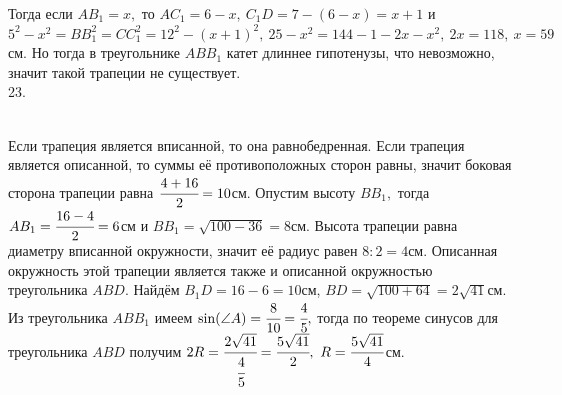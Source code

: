 \documentclass[12pt]{article}
\begin{document}
Тогда если $AB_1=x,$ то $AC_1=6-x,\ C_1D=7-(6-x)=x+1$ и $5^2-x^2=BB_1^2=CC_1^2=12^2-(x+1)^2,\ 25-x^2=144-1-2x-x^2,\ 2x=118,\ x=59$см. Но тогда в треугольнике
$ABB_1$ катет длиннее гипотенузы, что невозможно, значит такой трапеции не существует.\\
23. \begin{figure}[ht!]
\end{figure}\\
Если трапеция является вписанной, то она равнобедренная. Если трапеция является описанной, то суммы её противоположных сторон равны, значит боковая сторона трапеции равна $\cfrac{4+16}{2}=10$см. Опустим высоту $BB_1,$ тогда $AB_1=\cfrac{16-4}{2}=6$см и $BB_1=\sqrt{100-36}=8$см. Высота трапеции равна диаметру вписанной окружности, значит её радиус равен $8:2=4$см. Описанная окружность этой трапеции является также и описанной окружностью треугольника $ABD.$ Найдём $B_1D=16-6=10$см, $BD=\sqrt{100+64}=2\sqrt{41}$см. Из треугольника $ABB_1$ имеем $\sin(\angle A)=\cfrac{8}{10}=\cfrac{4}{5},$ тогда по теореме синусов для треугольника $ABD$ получим $2R=\cfrac{2\sqrt{41}}{\cfrac{4}{5}}=\cfrac{5\sqrt{41}}{2},\ R=\cfrac{5\sqrt{41}}{4}$см.\\
\end{document}
